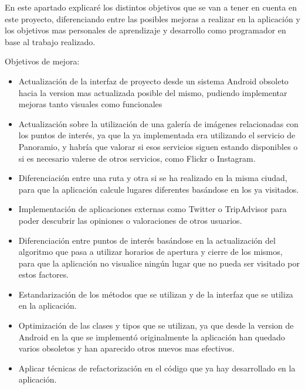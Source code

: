
En este apartado explicaré los distintos objetivos que se van a tener en cuenta en este proyecto, diferenciando entre las posibles mejoras a realizar en la aplicación y los objetivos mas personales de aprendizaje y desarrollo como programador en base al trabajo realizado.

Objetivos de mejora:
\begin{itemize}
\item Actualización de la interfaz de proyecto desde un sistema Android obsoleto hacia la version mas actualizada posible del mismo, pudiendo implementar mejoras tanto visuales como funcionales
\item Actualización sobre la utilización de una galería de imágenes relacionadas con los puntos de interés, ya que la ya implementada era utilizando el servicio de Panoramio, y habría que valorar si esos servicios siguen estando disponibles o si es necesario valerse de otros servicios, como Flickr o Instagram.
\item Diferenciación entre una ruta y otra si se ha realizado en la misma ciudad, para que la aplicación calcule lugares diferentes basándose en los ya visitados.
\item Implementación de aplicaciones externas como Twitter o TripAdvisor para poder descubrir las opiniones o valoraciones de otros usuarios.
\item Diferenciación entre puntos de interés basándose en la actualización del algoritmo que pasa a utilizar horarios de apertura y cierre de los mismos, para que la aplicación no visualice ningún lugar que no pueda ser visitado por estos factores.
\item Estandarización de los métodos que se utilizan y de la interfaz que se utiliza en la aplicación.
\item Optimización de las clases y tipos que se utilizan, ya que desde la version de Android en la que se implementó originalmente la aplicación han quedado varios obsoletos y han aparecido otros nuevos mas efectivos.
\item Aplicar técnicas de refactorización en el código que ya hay desarrollado en la aplicación.
\end{itemize}


